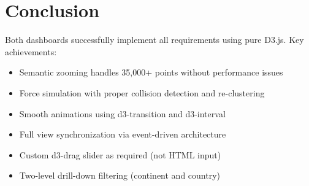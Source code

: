 \documentclass[11pt,a4paper]{article}
\begin{document}
\section{Conclusion}
Both dashboards successfully implement all requirements using pure D3.js. Key achievements:
\begin{itemize}[noitemsep]
    \item Semantic zooming handles 35,000+ points without performance issues
    \item Force simulation with proper collision detection and re-clustering
    \item Smooth animations using d3-transition and d3-interval
    \item Full view synchronization via event-driven architecture
    \item Custom d3-drag slider as required (not HTML input)
    \item Two-level drill-down filtering (continent and country)
\end{itemize}
\end{document}
